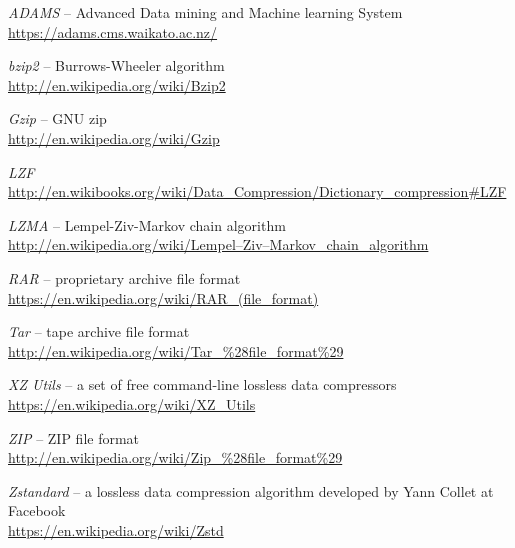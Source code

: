 
\begin{thebibliography}{999}

		\textit{ADAMS} -- Advanced Data mining and Machine learning System \\
		\url{https://adams.cms.waikato.ac.nz/}{}
		
		\textit{bzip2} -- Burrows-Wheeler algorithm \\
		\url{http://en.wikipedia.org/wiki/Bzip2}{}
		
		\textit{Gzip} -- GNU zip \\
		\url{http://en.wikipedia.org/wiki/Gzip}{}
		
		\textit{LZF} \\
		\url{http://en.wikibooks.org/wiki/Data_Compression/Dictionary_compression#LZF}{}
		
		\textit{LZMA} -- Lempel-Ziv-Markov chain algorithm \\
		\url{http://en.wikipedia.org/wiki/Lempel–Ziv–Markov_chain_algorithm}{}

		\textit{RAR} -- proprietary archive file format \\
		\url{https://en.wikipedia.org/wiki/RAR_(file_format)}{}

		\textit{Tar} -- tape archive file format \\
		\url{http://en.wikipedia.org/wiki/Tar_\%28file_format\%29}{}

		\textit{XZ Utils} -- a set of free command-line lossless data compressors \\
		\url{https://en.wikipedia.org/wiki/XZ_Utils}{}

		\textit{ZIP} -- ZIP file format \\
		\url{http://en.wikipedia.org/wiki/Zip_\%28file_format\%29}{}

		\textit{Zstandard} -- a lossless data compression algorithm developed by Yann Collet at Facebook \\
		\url{https://en.wikipedia.org/wiki/Zstd}{}

\end{thebibliography}
